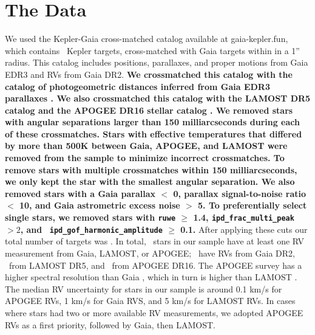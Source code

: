 \section{The Data}
\label{sec:data}

We used the Kepler-Gaia cross-matched catalog available at gaia-kepler.fun,
which contains \nfun\ Kepler targets, cross-matched with Gaia targets within
in a 1'' radius.
This catalog includes positions, parallaxes, and proper motions from
Gaia EDR3 and RVs from Gaia DR2.
{\bf We crossmatched this catalog with the catalog of photogeometric
distances inferred from Gaia EDR3 parallaxes \citep{bailer-jones2021}.
We also crossmatched this catalog with the LAMOST DR5 catalog and the APOGEE
DR16 stellar catalog \citep{cui2012, apogee_dr16, xiang2019}.
We removed stars with angular separations larger than 150 milliarcseconds
during each of these crossmatches.
Stars with effective temperatures that differed by more than 500K between
Gaia, APOGEE, and LAMOST were removed from the sample to minimize incorrect
crossmatches.
To remove stars with multiple crossmatches within 150 milliarcseconds, we only
kept the star with the smallest angular separation.
We also removed stars with a Gaia parallax $<$ 0, parallax signal-to-noise
ratio $<$ 10, and Gaia astrometric excess noise $>$ 5.
To preferentially select single stars, we removed stars with {\tt ruwe} $\geq$
1.4, {\tt ipd\_frac\_multi\_peak} $>2$, and {\tt
ipd\_gof\_harmonic\_amplitude} $\geq$ 0.1.
}
After applying these cuts our total number of targets was \nstars.
In total, \nrv\ stars in our sample have at least one RV measurement from
Gaia, LAMOST, or APOGEE; \ngaia\ have RVs from Gaia DR2, \nlamost\ from LAMOST
DR5, and \napogee\ from APOGEE DR16.
The APOGEE survey \citep[R $=$ 22,500;][]{apogee} has a higher spectral
resolution than Gaia \citep[R $=$ 11,500;][]{cropper2018}, which in turn is
higher than LAMOST \citep[R $=$ 1,800;][]{zhao2012}.
The median RV uncertainty for stars in our sample is around 0.1 km/s for
APOGEE RVs, 1 km/s for Gaia RVS, and 5 km/s for LAMOST RVs.
In cases where stars had two or more available RV measurements, we adopted
APOGEE RVs as a first priority, followed by Gaia, then LAMOST.

